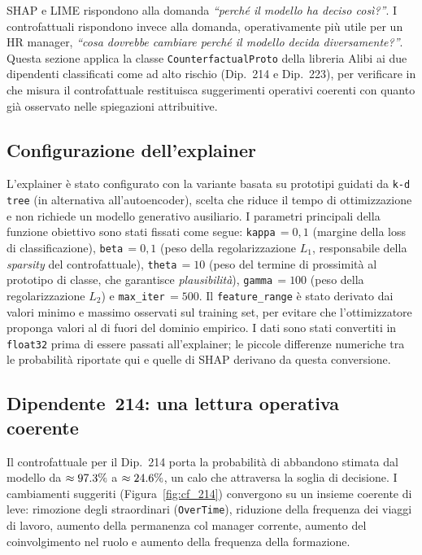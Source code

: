 SHAP e LIME rispondono alla domanda \emph{``perché il modello ha deciso così?''}. I controfattuali rispondono invece alla domanda, operativamente più utile per un HR manager, \emph{``cosa dovrebbe cambiare perché il modello decida diversamente?''}. Questa sezione applica la classe \texttt{CounterfactualProto} della libreria Alibi ai due dipendenti classificati come ad alto rischio (Dip.~214 e Dip.~223), per verificare in che misura il controfattuale restituisca suggerimenti operativi coerenti con quanto già osservato nelle spiegazioni attribuitive.

\subsection{Configurazione dell'explainer}

L'explainer è stato configurato con la variante basata su prototipi guidati da \texttt{k-d tree} (in alternativa all'autoencoder), scelta che riduce il tempo di ottimizzazione e non richiede un modello generativo ausiliario. I parametri principali della funzione obiettivo sono stati fissati come segue: \texttt{kappa}\,$=0{,}1$ (margine della loss di classificazione), \texttt{beta}\,$=0{,}1$ (peso della regolarizzazione $L_1$, responsabile della \emph{sparsity} del controfattuale), \texttt{theta}\,$=10$ (peso del termine di prossimità al prototipo di classe, che garantisce \emph{plausibilità}), \texttt{gamma}\,$=100$ (peso della regolarizzazione $L_2$) e \texttt{max\_iter}\,$=500$. Il \texttt{feature\_range} è stato derivato dai valori minimo e massimo osservati sul training set, per evitare che l'ottimizzatore proponga valori al di fuori del dominio empirico. I dati sono stati convertiti in \texttt{float32} prima di essere passati all'explainer; le piccole differenze numeriche tra le probabilità riportate qui e quelle di SHAP derivano da questa conversione.

\subsection{Dipendente~214: una lettura operativa coerente}

Il controfattuale per il Dip.~214 porta la probabilità di abbandono stimata dal modello da $\approx \num{97{,}3}\%$ a $\approx \num{24{,}6}\%$, un calo che attraversa la soglia di decisione. I cambiamenti suggeriti (Figura~\ref{fig:cf_214}) convergono su un insieme coerente di leve: rimozione degli straordinari (\texttt{OverTime}), riduzione della frequenza dei viaggi di lavoro, aumento della permanenza col manager corrente, aumento del coinvolgimento nel ruolo e aumento della frequenza della formazione.

